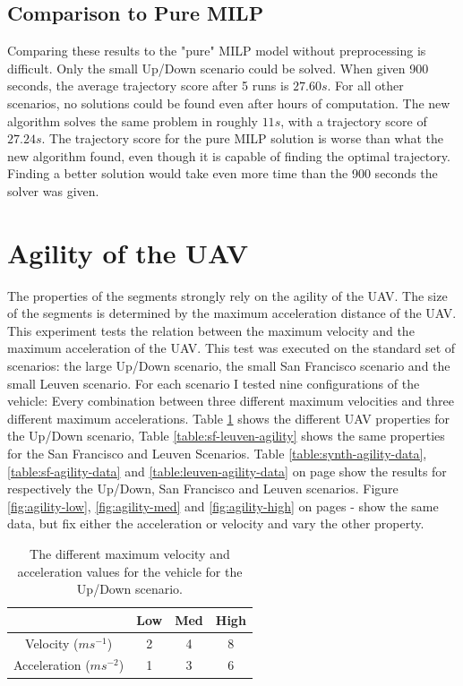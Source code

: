 \subsection{Comparison to Pure MILP}
Comparing these results to the "pure" MILP model without preprocessing is difficult. Only the small Up/Down scenario could be solved. When given 900 seconds, the average trajectory score after 5 runs is $27.60s$. For all other scenarios, no solutions could be found even after hours of computation. The new algorithm solves the same problem in roughly $11s$, with a trajectory score of $27.24s$. The trajectory score for the pure MILP solution is worse than what  the new algorithm found, even though it is capable of finding the optimal trajectory. Finding a better solution would take even more time than the 900 seconds the solver was given.
\clearpage
\section{Agility of the UAV}
\label{subsec:agility}
The properties of the segments strongly rely on the agility of the UAV. The size of the segments is determined by the maximum acceleration distance of the UAV. \\
This experiment tests the relation between the maximum velocity and the maximum acceleration of the UAV. This test was executed on the standard set of scenarios: the large Up/Down scenario, the small San Francisco scenario and the small Leuven scenario. For each scenario I tested nine configurations of the vehicle: Every combination between three different maximum velocities and three different maximum accelerations. Table \ref{table:synth-agility} shows the different UAV properties for the Up/Down scenario, Table \ref{table:sf-leuven-agility} shows the same properties for the San Francisco and Leuven Scenarios. Table \ref{table:synth-agility-data}, \ref{table:sf-agility-data} and \ref{table:leuven-agility-data} on page \pageref{table:sf-agility-data} show the results for respectively the Up/Down, San Francisco and Leuven scenarios. Figure \ref{fig:agility-low}, \ref{fig:agility-med} and \ref{fig:agility-high} on pages \pageref{fig:agility-low}-\pageref{fig:agility-high} show the same data, but fix either the acceleration or velocity and vary the other property. \\

\begin{table}[h]
\centering
\begin{tabular}{ c || c | c | c}
 & Low & Med & High \\
\hline\hline
Velocity ($ms^{-1}$) 	& 2		& 4		& 8 	\\ 
\hline
Acceleration ($ms^{-2}$)& 1		& 3 	& 6 	\\  
\end{tabular}
\caption{The different maximum velocity and acceleration values for the vehicle for the Up/Down scenario.}
\label{table:synth-agility}
\end{table}

